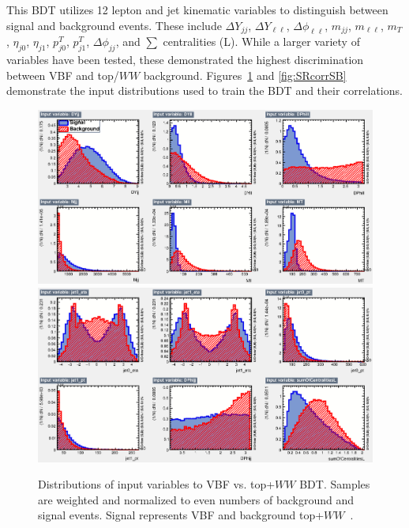 This BDT utilizes 12 lepton and jet kinematic variables to distinguish between signal and background events. These include $\Delta Y_{jj}$, $\Delta Y_{\ell\ell}$, $\Delta \phi_{\ell\ell}$, $m_{jj}$, $m_{\ell\ell}$, $m_T$, $\eta_{j0}$, $\eta_{j1}$, $p^T_{j0}$, $p^T_{j1}$, $\Delta \phi_{jj}$, and $\sum$ centralities (L). While a larger variety of variables have been tested, these demonstrated the highest discrimination between VBF and top/$WW$ background. Figures~\ref{fig:SRBDTinput} and \ref{fig:SRcorrSB} demonstrate the input distributions used to train the BDT and their correlations.
\begin{figure}[!htbp]
    \centering
    \includegraphics[width=0.7\linewidth]{Pictures/VBFvsWW+Top/variables_id_c1.eps}
    \includegraphics[width=0.7\linewidth]{Pictures/VBFvsWW+Top/variables_id_c2.eps}
    \caption{Distributions of input variables to VBF vs. top+$WW$ BDT. Samples are weighted and normalized to even numbers of background and signal events. Signal represents VBF and background top+$WW$~\cite{ourSupportNote}.}
    \label{fig:SRBDTinput}
\end{figure}

